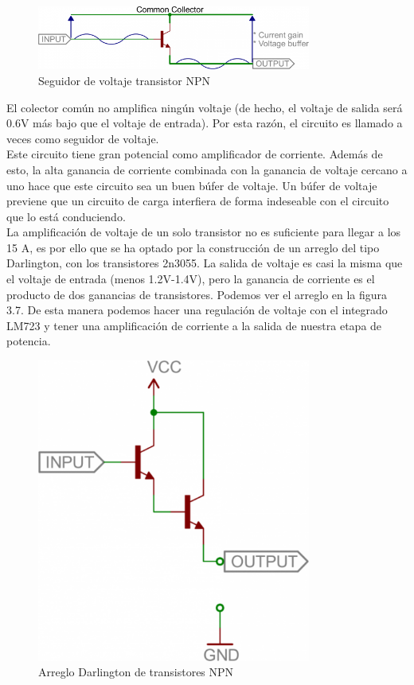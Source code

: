 \begin{figure}[H]
\centering
\includegraphics[width=9cm]{Capitulo4/seguidor.png}
\caption{Seguidor de voltaje transistor NPN}
\end{figure}

El colector común no amplifica ningún voltaje (de hecho, el voltaje de salida será 0.6V más bajo que el voltaje de entrada). Por esta razón, el circuito es llamado a veces como seguidor de voltaje.\\

Este circuito tiene gran potencial como amplificador de corriente. Además de esto, la alta ganancia de corriente combinada con la ganancia de voltaje cercano a uno hace que este circuito sea un buen búfer de voltaje. Un búfer de voltaje previene que un circuito de carga interfiera de forma indeseable con el circuito que lo está conduciendo.\cite{C5}\\

La amplificación de voltaje de un solo transistor no es suficiente para llegar a los 15 A, es por ello que se ha optado por la construcción de un arreglo del tipo Darlington, con los transistores 2n3055. La salida de voltaje es casi la misma que el voltaje de entrada (menos 1.2V-1.4V), pero la ganancia de corriente es el producto de dos ganancias de transistores. Podemos ver el arreglo en la figura 3.7. De esta manera podemos hacer una regulación de voltaje con el integrado LM723  y tener una amplificación de corriente a la salida de nuestra etapa de potencia.\\

\begin{figure}[H]
\centering
\includegraphics[width=9cm]{Capitulo4/darlin.png}
\caption{Arreglo Darlington de transistores NPN}
\end{figure}


